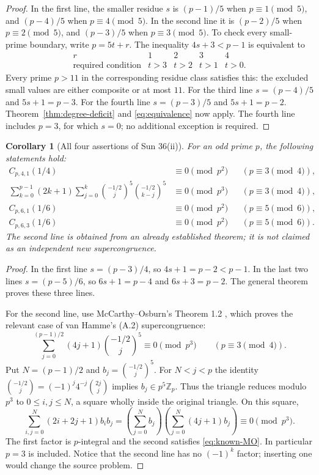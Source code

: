 \documentclass[11pt,a4paper]{article}
\newtheorem{corollary}[theorem]{Corollary}
\theoremstyle{remark}
\newcommand{\Zp}{\mathbb Z_p}
\begin{document}
\begin{proof}
In the first line, the smaller residue $s$ is $(p-1)/5$ when
$p\equiv1\pmod5$, and $(p-4)/5$ when $p\equiv4\pmod5$.
In the second line it is $(p-2)/5$ when $p\equiv2\pmod5$, and
$(p-3)/5$ when $p\equiv3\pmod5$.
To check every small-prime boundary, write $p=5t+r$.
The inequality $4s+3<p-1$ is equivalent to
\[
\begin{array}{c|cccc}
r&1&2&3&4\\ \hline
\text{required condition}&t>3&t>2&t>1&t>0 .
\end{array}
\]
Every prime $p>11$ in the corresponding residue class satisfies this:
the excluded small values are either composite or at most $11$.
For the third line $s=(p-4)/5$ and $5s+1=p-3$.
For the fourth line $s=(p-3)/5$ and $5s+1=p-2$.
Theorem~\ref{thm:degree-deficit} and \eqref{eq:equivalence} now apply.
The fourth line includes $p=3$, for which $s=0$; no additional
exception is required.
\end{proof}

\begin{corollary}[All four assertions of Sun 36(ii)]\label{cor:sun36ii}
For an odd prime $p$, the following statements hold:
\begin{align*}
 C_{p,4,1}(1/4)&\equiv0\pmod{p^2}&&(p\equiv3\pmod4),\\
 \sum_{k=0}^{p-1}(2k+1)\sum_{j=0}^k
    \binom{-1/2}{j}^{5}\binom{-1/2}{k-j}^{5}
       &\equiv0\pmod{p^3}&&(p\equiv3\pmod4),\\
 C_{p,6,1}(1/6)&\equiv0\pmod{p^2}&&(p\equiv5\pmod6),\\
 C_{p,6,3}(1/6)&\equiv0\pmod{p^2}&&(p\equiv5\pmod6).
\end{align*}
The second line is obtained from an already established theorem;
it is not claimed as an independent new supercongruence.
\end{corollary}

\begin{proof}
In the first line $s=(p-3)/4$, so $4s+1=p-2<p-1$.
In the last two lines $s=(p-5)/6$, so $6s+1=p-4$ and
$6s+3=p-2$. The general theorem proves these three lines.

For the second line, use McCarthy--Osburn's Theorem 1.2
\cite{mccarthyosburn2008}, which proves the relevant case of
van Hamme's (A.2) supercongruence:
\begin{equation}\label{eq:known-MO}
 \sum_{j=0}^{(p-1)/2}(4j+1)\binom{-1/2}{j}^{5}
       \equiv0\pmod{p^3}\qquad(p\equiv3\pmod4).
\end{equation}
Put $N=(p-1)/2$ and $b_j=\binom{-1/2}{j}^{5}$.
For $N<j<p$ the identity
$\binom{-1/2}{j}=(-1)^j4^{-j}\binom{2j}{j}$ implies
$b_j\in p^5\Zp$. Thus the triangle reduces modulo $p^3$ to
$0\le i,j\le N$, a square wholly inside the original triangle.
On this square,
\[
 \sum_{i,j=0}^N(2i+2j+1)b_ib_j
 =\left(\sum_{j=0}^Nb_j\right)
  \left(\sum_{j=0}^N(4j+1)b_j\right)\equiv0\pmod{p^3}.
\]
The first factor is $p$-integral and the second satisfies
\eqref{eq:known-MO}. In particular $p=3$ is included.
Notice that the second line has no $(-1)^k$ factor; inserting one
would change the source problem.
\end{proof}
\end{document}
